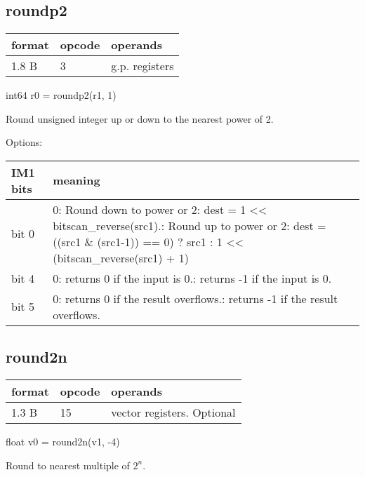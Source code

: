 \documentclass[forwardcom.tex]{subfiles}
\begin{document}
\subsection{roundp2}
\label{table:roundP2Instruction}
\begin{tabular}{|p{12mm}|p{15mm}|p{100mm}|}
\hline
\bfseries format & \bfseries opcode & \bfseries operands \\ \hline
1.8 B &  3 & g.p. registers \\ \hline
\end{tabular}
\vv

int64 r0 = roundp2(r1, 1)
\vv

Round unsigned integer up or down to the nearest power of 2. 
\vv

Options:

\label{table:roundp2Options}
\begin{tabular}{|p{16mm}|p{122mm}|}
\hline
\bfseries IM1 bits & \bfseries meaning \\ \hline
bit 0 & 0: Round down to power or 2:\newline
dest = 1 \textless\textless{} bitscan\_reverse(src1).\newline
        1: Round up to power or 2:\newline
dest = ((src1 \& (src1-1)) == 0) ? src1 : 1 \textless\textless{}  (bitscan\_reverse(src1) + 1)
\\ \hline
bit 4 & 0: returns 0 if the input is 0.\newline
        1: returns -1 if the input is 0.\\ \hline
bit 5 & 0: returns 0 if the result overflows.\newline
        1: returns -1 if the result overflows.\\ \hline        
\end{tabular}
\vv


\subsection{round2n}
\label{table:round2nInstruction}
\begin{tabular}{|p{12mm}|p{15mm}|p{100mm}|}
\hline
\bfseries format & \bfseries opcode & \bfseries operands \\ \hline
1.3 B & 15 & vector registers. Optional \\ \hline
\end{tabular}
\vv

float v0 = round2n(v1, -4)
\vv

Round to nearest multiple of $2^n$.
\end{document}
